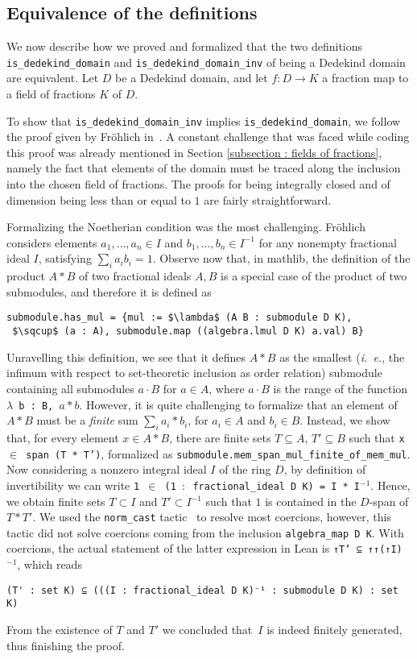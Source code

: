 \documentclass[sn-mathphys]{sn-jnl}%
\newcommand{\inv}{\ensuremath{{}^{-1}}}
\newcommand{\lean}[1]{\texttt{#1}\xspace}
\newcommand{\mathlib}{\textsf{mathlib}\xspace}
\begin{document}
\subsection{Equivalence of the definitions} \label{sec:equivalence}
We now describe how we proved and formalized that the two definitions \lean{is\_dedekind\_domain} and \lean{is\_dedekind\_domain\_inv} of being a Dedekind domain are equivalent. Let $D$ be a Dedekind domain, and let $f\colon D\to K$ a fraction map to a field of fractions $K$ of $D$.

To show that \lean{is\_dedekind\_domain\_inv} implies \lean{is\_dedekind\_domain}, we follow the proof given by Fr\"ohlich in~\cite[Chapter 1, Section~2, Proposition~1.2.1]{frohlich}. A constant challenge that was faced while coding this proof was already mentioned in Section \ref{subsection : fields of fractions}, namely the fact that elements of the domain must be traced along the inclusion into the chosen field of fractions.
The proofs for being integrally closed and of dimension being less than or equal to $1$ are fairly straightforward.

Formalizing the Noetherian condition was the most challenging. Fr\"ohlich considers elements $a_1, \dots, a_n \in I$ and $b_1, \dots, b_n \in I^{-1}$ for any nonempty fractional ideal $I$,
satisfying $ \sum_i a_i b_i = 1 $. Observe now that, in \mathlib, the definition of the product $A\ast B$ of two fractional ideals $A,B$ is a special case of the product of two submodules, and therefore it is defined as
\begin{lstlisting}
submodule.has_mul = {mul := $\lambda$ (A B : submodule D K),
 $\sqcup$ (a : A), submodule.map ((algebra.lmul D K) a.val) B}
\end{lstlisting}
Unravelling this definition, we see that it defines $A\ast B$ as the smallest (\emph{i.~e.}, the infimum with respect to set-theoretic inclusion as order relation) submodule containing all submodules $a\cdot B$ for $a\in A$, where $a \cdot B$ is the range of the function \lean{$\lambda$ b : B, $a\ast b$}. However, it is quite challenging to formalize that an element of $A\ast B$ must be a \emph{finite} sum $\sum_{i} a_i*b_i$, for $a_i \in A$ and $b_i \in B$. Instead, we show that, for every element $x\in A\ast B$, there are finite sets $T\subseteq A$, $T'\subseteq B$ such that \lean{x $\in$ span (T * T')}, formalized as
\lean{submodule.mem\_span\_mul\_finite\-\_of\-\_mem\-\_mul}.
Now considering a nonzero integral ideal $I$ of the ring $D$, by definition of invertibility we can write \lean{1 $\in$ (1 $:$ fractional\_ideal D K) = I * I\inv}. Hence, we obtain 
finite sets $T \subset I$ and $T' \subset I\inv$ such that $1$ is contained in the $D$-span of $T*T'$. We used the \lean{norm\_cast} tactic~\cite{norm_cast} to resolve most coercions, however, this tactic did not solve coercions coming from the inclusion \lean{algebra\_map D K}. With coercions, the actual statement of the latter expression in Lean is \lean{↑T' ⊆ ↑↑(↑I)\inv}, which reads
\begin{lstlisting}
(T' : set K) ⊆ (((I : fractional_ideal D K)⁻¹ : submodule D K) : set K)
\end{lstlisting}
From the existence of $T$ and $T'$ we concluded that~$I$ is indeed finitely generated, thus finishing the proof.
\end{document}
